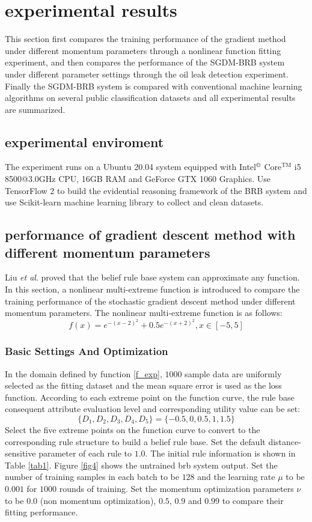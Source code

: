 \documentclass{ieeeaccess}
\begin{document}
\section{experimental results}
This section first compares the training performance of the gradient method under different momentum parameters through a nonlinear function fitting experiment,
and then compares the performance of the SGDM-BRB system under different parameter settings through the oil leak detection experiment.
Finally the SGDM-BRB system is compared with conventional machine learning algorithms on several public classification datasets and all experimental results are summarized.

\subsection{experimental enviroment}
The experiment runs on a Ubuntu 20.04 system equipped with Intel$^{\copyright}$ Core$^{\text{TM}}$ i5 8500@3.0GHz CPU, 16GB RAM and GeForce GTX 1060 Graphics.
Use TensorFlow 2 to build the evidential reasoning framework of the BRB system and use Scikit-learn machine learning library to collect and clean datasets.

\subsection{performance of gradient descent method with different momentum parameters}
Liu \textit{et al}.\cite{a16} proved that the belief rule base system can approximate any function.
In this section, a nonlinear multi-extreme function is introduced to compare the training performance of the stochastic gradient descent method under different momentum parameters.
The nonlinear multi-extreme function is as follows:
\begin{equation}
    f(x)=e^{-(x-2)^2}+0.5e^{-(x+2)^2},x\in[-5,5]
    \label{f_exp}
\end{equation}

\subsubsection{Basic Settings And Optimization}
In the domain defined by function \eqref{f_exp}, $1000$ sample data are uniformly selected as the fitting dataset and the mean square error is used as the loss function.
According to each extreme point on the function curve, the rule base consequent attribute evaluation level and corresponding utility value can be set:
$$\{D_1,D_2,D_3,D_4,D_5\}=\{-0.5,0,0.5,1,1.5\}$$
Select the five extreme points on the function curve to convert to the corresponding rule structure to build a belief rule base.
Set the default distance-sensitive parameter of each rule to $1.0$.
The initial rule information is shown in Table \ref{tab1}. Figure \ref{fig4} shows the untrained brb system output.
Set the number of training samples in each batch to be $128$ and the learning rate $\mu$ to be $0.001$ for $1000$ rounds of training.
Set the momentum optimization parameters $\nu$ to be 0.0 (non momentum optimization), $0.5$, $0.9$ and $0.99$ to compare their fitting performance.
\end{document}
